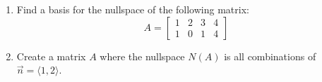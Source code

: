 \documentclass[10pt, a4paper]{article}
\theoremstyle{break}
\begin{document}
\begin{enumerate}
\item Find a basis for the nullspace of the following matrix:
\begin{equation}
A=
\begin{bmatrix}
1 & 2 & 3 &4 \\
1 &0 & 1 &4 
\end{bmatrix}
\nonumber
\end{equation}







\item Create a matrix $A$ where the nullspace $N(A)$ is all combinations of $\vec{n}=\langle 1, 2 \rangle$.




\end{enumerate}
\end{document}
